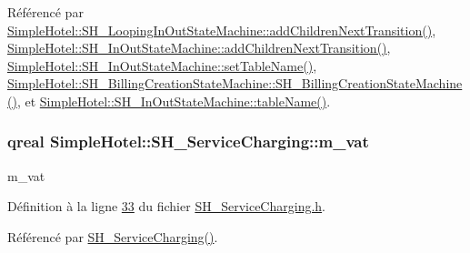 Référencé par \hyperlink{classSimpleHotel_1_1SH__LoopingInOutStateMachine_a2ac2ff43d97fd1b12e1b30d6818f33e4}{Simple\-Hotel\-::\-S\-H\-\_\-\-Looping\-In\-Out\-State\-Machine\-::add\-Children\-Next\-Transition()}, \hyperlink{classSimpleHotel_1_1SH__InOutStateMachine_aaf5afe04d6e4d3d5ebf0b5f1b00eddf1}{Simple\-Hotel\-::\-S\-H\-\_\-\-In\-Out\-State\-Machine\-::add\-Children\-Next\-Transition()}, \hyperlink{classSimpleHotel_1_1SH__InOutStateMachine_adae23a212e9ba1e590f062994cd367a6}{Simple\-Hotel\-::\-S\-H\-\_\-\-In\-Out\-State\-Machine\-::set\-Table\-Name()}, \hyperlink{classSimpleHotel_1_1SH__BillingCreationStateMachine_a8c7d39e11d0ced1fd9c27a5550465b86}{Simple\-Hotel\-::\-S\-H\-\_\-\-Billing\-Creation\-State\-Machine\-::\-S\-H\-\_\-\-Billing\-Creation\-State\-Machine()}, et \hyperlink{classSimpleHotel_1_1SH__InOutStateMachine_a9fd170fd458e524ac0629b64d5323a45}{Simple\-Hotel\-::\-S\-H\-\_\-\-In\-Out\-State\-Machine\-::table\-Name()}.

\hypertarget{classSimpleHotel_1_1SH__ServiceCharging_a4cb1fa10bbf8365734f68da006b887af}{
\subsubsection[{m\-\_\-vat}]{\setlength{\rightskip}{0pt plus 5cm}qreal Simple\-Hotel\-::\-S\-H\-\_\-\-Service\-Charging\-::m\-\_\-vat\hspace{0.3cm}{\ttfamily [private]}}}\label{classSimpleHotel_1_1SH__ServiceCharging_a4cb1fa10bbf8365734f68da006b887af}


m\-\_\-vat 



Définition à la ligne \hyperlink{SH__ServiceCharging_8h_source_l00033}{33} du fichier \hyperlink{SH__ServiceCharging_8h_source}{S\-H\-\_\-\-Service\-Charging.\-h}.



Référencé par \hyperlink{classSimpleHotel_1_1SH__ServiceCharging_ae82c86c7e955f0dc93cdfc3603789b87}{S\-H\-\_\-\-Service\-Charging()}.



